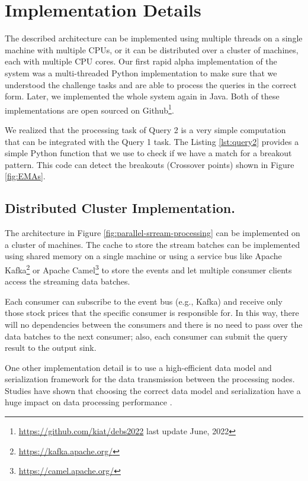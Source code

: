 \section{Implementation Details}\label{sec:implementation}
The described architecture can be implemented using multiple threads on a single machine with multiple CPUs, or it can be distributed over a cluster of machines, each with multiple CPU cores.
Our first rapid alpha implementation of the system was a multi-threaded Python implementation to make sure that we understood the challenge tasks and are able to process the queries in the correct form.
Later, we implemented the whole system again in Java. Both of these implementations are open sourced on Github\footnote{\url{https://github.com/kiat/debs2022} last update June, 2022}.


We realized that the processing task of Query 2 is a very simple computation that can be integrated with the Query 1 task.
The Listing \ref{lst:query2} provides a simple Python function that we use to check if we have a match for a breakout pattern.
This code can detect the breakouts (Crossover points) shown in Figure \ref{fig:EMAs}.



\subsection{Distributed Cluster Implementation.}
The architecture in Figure \ref{fig:parallel-srream-processing} can be implemented on a cluster of machines. The cache to store the stream batches can be implemented using shared memory on a single machine or using a service bus like Apache Kafka\footnote{\url{https://kafka.apache.org/}} or Apache Camel\footnote{\url{https://camel.apache.org/}} to store
the events and let multiple consumer clients access the streaming data batches.

Each consumer can subscribe to the event bus (e.g., Kafka) and receive only those stock prices that the specific consumer is responsible
for. In this way, there will no dependencies between the consumers and there is no need to pass over the data batches to the next
consumer; also, each consumer can submit the query result to the output sink.

One other implementation detail is to use a high-efficient data model and serialization framework for the data transmission between
the processing nodes. Studies have shown that choosing the correct data model and serialization have a huge impact on data processing performance \cite{DBLP:conf/cloud/SikdarTJ17}.

